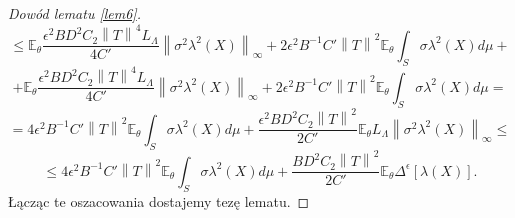 \documentclass{mwart}
\newcommand{\norm}[1]{\left\lVert#1\right\rVert}
\begin{document}
\begin{proof}[Dowód lematu \ref{lem6}]
\begin{displaymath}
\leq \mathbb{E}_{\theta}\frac{\epsilon^2BD^2C_2\norm{T}^4L_{\Lambda}}{4C'}\norm{\sigma^2\lambda^2(X)}_{\infty}+2\epsilon^2B^{-1}C'\norm{T}^2\mathbb{E}_{\theta}\int_S\sigma\lambda^2(X)d\mu+
\end{displaymath}
\begin{displaymath}
+\mathbb{E}_{\theta}\frac{\epsilon^2BD^2C_2\norm{T}^4L_{\Lambda}}{4C'}\norm{\sigma^2\lambda^2(X)}_{\infty}+2\epsilon^2B^{-1}C'\norm{T}^2\mathbb{E}_{\theta}\int_S\sigma\lambda^2(X)d\mu=
\end{displaymath}
\begin{displaymath}
=4\epsilon^2B^{-1}C'\norm{T}^2\mathbb{E}_{\theta}\int_S\sigma\lambda^2(X)d\mu+\frac{\epsilon^2BD^2C_2\norm{T}^2}{2C'}\mathbb{E}_{\theta}L_{\Lambda}\norm{\sigma^2\lambda^2(X)}_{\infty}\leq
\end{displaymath}
\begin{displaymath}
\leq 4\epsilon^2B^{-1}C'\norm{T}^2\mathbb{E}_{\theta}\int_S\sigma\lambda^2(X)d\mu+\frac{BD^2C_2\norm{T}^2}{2C'}\mathbb{E}_{\theta}\Delta^{\epsilon}[\lambda(X)].
\end{displaymath}
Łącząc te oszacowania dostajemy tezę lematu.
\end{proof}
\end{document}
